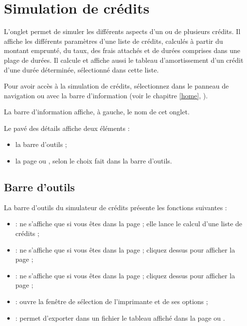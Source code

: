 

\chapter{Simulation de crédits\label{credit}}


L'onglet  permet de simuler les différents aspects d'un ou de plusieurs crédits. Il affiche les différents paramètres d'une liste de crédits, calculés à partir du montant emprunté, du taux, des frais attachés et de durées comprises dans une plage de durées. Il calcule et affiche aussi le tableau d'amortissement d'un crédit d'une durée déterminée, sélectionné dans cette liste.

Pour avoir accès à la simulation de crédits, sélectionnez  dans le panneau de navigation ou avec la barre d'information (voir le chapitre \vref{home}, ).

La barre d'information affiche, à gauche, le nom de cet onglet.

Le pavé des détails affiche deux éléments :
\begin{itemize}
	 \item la barre d'outils ;
	 \item la page  ou , selon le choix fait dans la barre d'outils.
\end{itemize}


\section{Barre d'outils\label{credit-functions}}


La barre d'outils du simulateur de crédits présente les fonctions suivantes  :

\begin{itemize}
	 \item {} : ne s'affiche que si vous êtes dans la page  ; elle lance le calcul d'une liste de crédits ; 
	 \item {} : ne s'affiche que si vous êtes dans la page  ; cliquez dessus pour afficher la page   ;
	 \item {} : ne s'affiche que si vous êtes dans la page  ; cliquez dessus pour afficher la page   ;
	 \item {} : ouvre la fenêtre de sélection de l'imprimante et de ses options ;
	 \item {} : permet d'exporter dans un fichier le tableau affiché dans la page  ou .
\end{itemize}

